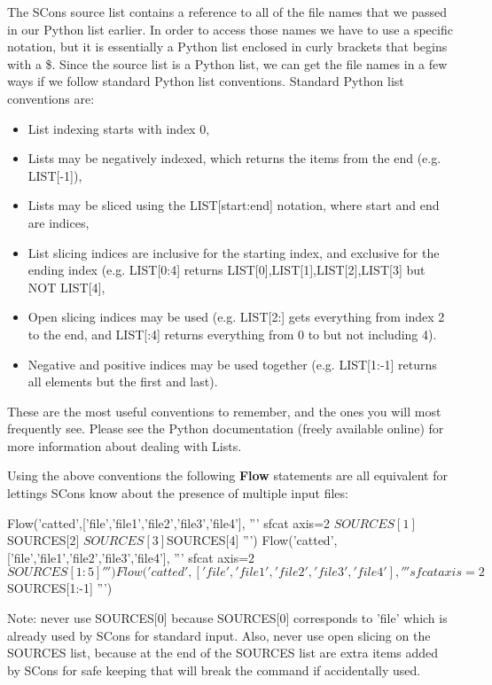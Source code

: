 The SCons source list contains a reference to all of the file names that we passed in our Python list earlier.  In order to access those names we have to use a specific notation, but it is essentially a Python list enclosed in curly brackets that begins with a \$. Since the source list is a Python list, we can get the file names in a few ways if we follow standard Python list conventions.   Standard Python list conventions are:
\begin{itemize}
\item List indexing starts with index 0,
\item Lists may be negatively indexed, which returns the items from the end (e.g. LIST[-1]),
\item Lists may be sliced using the LIST[start:end] notation, where start and end are indices,
\item List slicing indices are inclusive for the starting index, and exclusive for the ending index (e.g. LIST[0:4] returns LIST[0],LIST[1],LIST[2],LIST[3] but NOT LIST[4],
\item Open slicing indices may be used (e.g. LIST[2:] gets everything from index 2 to the end, and LIST[:4] returns everything from 0 to but not including 4).  
\item Negative and positive indices may be used together (e.g. LIST[1:-1] returns all elements but the first and last).
\end{itemize}
These are the most useful conventions to remember, and the ones you will most frequently see.  Please see the Python documentation (freely available online) for more information about dealing with Lists.

Using the above conventions the following \textbf{Flow} statements are all equivalent for lettings SCons know about the presence of multiple input files:
\begin{verbatimtab}[4]
Flow('catted',['file','file1','file2','file3','file4'],
    '''
    sfcat axis=2 ${SOURCES[1]} ${SOURCES[2]} 
    ${SOURCES[3]} ${SOURCES[4]}
    ''')
Flow('catted',['file','file1','file2','file3','file4'],
    '''
    sfcat axis=2 ${SOURCES[1:5]}
    ''')
Flow('catted',['file','file1','file2','file3','file4'],
    '''
    sfcat axis=2 ${SOURCES[1:-1]}
    ''')
\end{verbatimtab}
Note:  never use SOURCES[0] because SOURCES[0] corresponds to 'file' which is already used by SCons for standard input.   Also, never use open slicing on the SOURCES list, because at the end of the SOURCES list are extra items added by SCons for safe keeping that will break the command if accidentally used.

